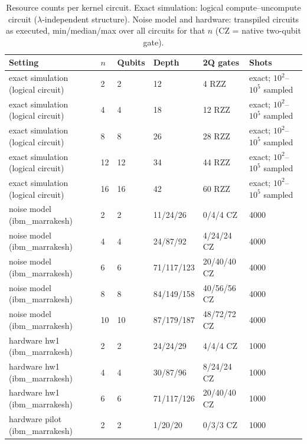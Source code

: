 \begin{table}[t]
\centering
\caption{Resource counts per kernel circuit. Exact simulation: logical compute--uncompute circuit ($\lambda$-independent structure). Noise model and hardware: transpiled circuits as executed, min/median/max over all circuits for that $n$ (CZ = native two-qubit gate).}
\label{tab:resources}
\setlength{\tabcolsep}{3pt}
\begin{tabular}{llllll}
\toprule
Setting & $n$ & Qubits & Depth & 2Q gates & Shots \\
\midrule
exact simulation (logical circuit) & 2 & 2 & 12 & 4 RZZ & exact; $10^{2}$--$10^{5}$ sampled \\
exact simulation (logical circuit) & 4 & 4 & 18 & 12 RZZ & exact; $10^{2}$--$10^{5}$ sampled \\
exact simulation (logical circuit) & 8 & 8 & 26 & 28 RZZ & exact; $10^{2}$--$10^{5}$ sampled \\
exact simulation (logical circuit) & 12 & 12 & 34 & 44 RZZ & exact; $10^{2}$--$10^{5}$ sampled \\
exact simulation (logical circuit) & 16 & 16 & 42 & 60 RZZ & exact; $10^{2}$--$10^{5}$ sampled \\
noise model (ibm\_marrakesh) & 2 & 2 & 11/24/26 & 0/4/4 CZ & 4000 \\
noise model (ibm\_marrakesh) & 4 & 4 & 24/87/92 & 4/24/24 CZ & 4000 \\
noise model (ibm\_marrakesh) & 6 & 6 & 71/117/123 & 20/40/40 CZ & 4000 \\
noise model (ibm\_marrakesh) & 8 & 8 & 84/149/158 & 40/56/56 CZ & 4000 \\
noise model (ibm\_marrakesh) & 10 & 10 & 87/179/187 & 48/72/72 CZ & 4000 \\
hardware hw1 (ibm\_marrakesh) & 2 & 2 & 24/24/29 & 4/4/4 CZ & 1000 \\
hardware hw1 (ibm\_marrakesh) & 4 & 4 & 30/87/96 & 8/24/24 CZ & 1000 \\
hardware hw1 (ibm\_marrakesh) & 6 & 6 & 71/117/126 & 20/40/40 CZ & 1000 \\
hardware pilot (ibm\_marrakesh) & 2 & 2 & 1/20/20 & 0/3/3 CZ & 1000 \\
\bottomrule
\end{tabular}
\end{table}
